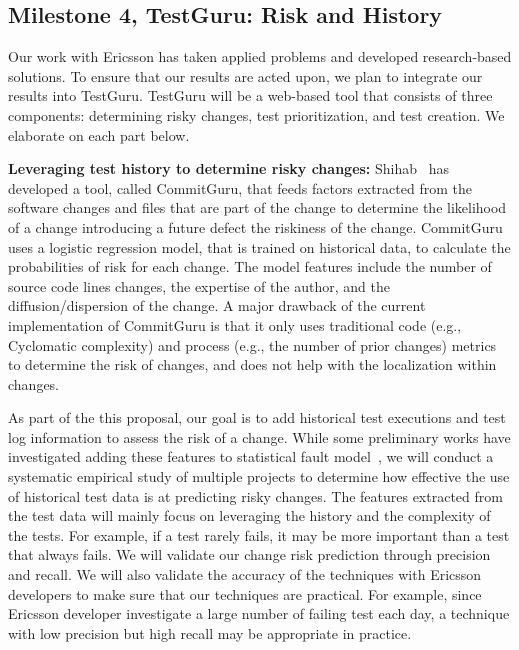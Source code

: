 \subsection{Milestone 4, TestGuru: Risk and History}
\label{secTestGuru}

Our work with Ericsson has taken applied problems and developed research-based solutions. To ensure that our results are acted upon, we plan to integrate our results into TestGuru. TestGuru will be a web-based tool that consists of three components: determining risky changes, test prioritization, and test creation. We elaborate on each part below.

\textbf{Leveraging test history to determine risky changes:} Shihab~\cite{Rosen2015FSE} has developed a tool, called CommitGuru, that feeds factors extracted from the software changes and files that are part of the change to determine the likelihood of a change introducing a future defect \ie the riskiness of the change. CommitGuru uses a logistic regression model, that is trained on historical data, to calculate the probabilities of risk for each change. The model features include the number of source code lines changes, the expertise of the author, and the diffusion/dispersion of the change. A major drawback of the current implementation of CommitGuru is that it only uses traditional code (e.g., Cyclomatic complexity) and process (e.g., the number of prior changes) metrics to determine the risk of changes, and does not help with the localization within changes. 

As part of the this proposal, our goal is to add historical test executions and test log information to assess the risk of a change. While some preliminary works have investigated adding these features to statistical fault model~\cite{Herzig2014ISSRE}, we will conduct a systematic empirical study of multiple projects to determine how effective the use of historical test data is at predicting risky changes. The features extracted from the test data will mainly focus on leveraging the history and the complexity of the tests. For example, if a test rarely fails, it may be more important than a test that always fails. We will validate our change risk prediction through precision and recall. We will also validate the accuracy of the techniques with Ericsson developers to make sure that our techniques are practical. For example, since Ericsson developer investigate a large number of failing test each day, a technique with low precision but high recall may be appropriate in practice.


